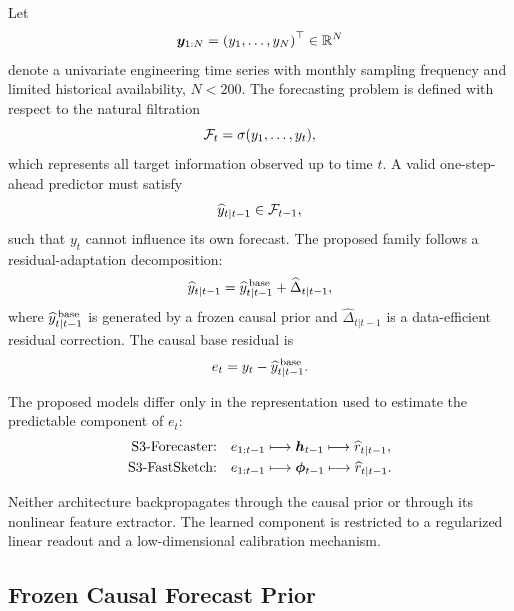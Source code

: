 \documentclass[review,number,sort&compress]{elsarticle}
\begin{document}
Let
\begin{equation}
    \bm{y}_{1:N}
    =
    \left(y_1,\ldots,y_N\right)^\top
    \in \mathbb{R}^N
\end{equation}
denote a univariate engineering time series with monthly sampling frequency and
limited historical availability, $N<200$. The forecasting problem is defined
with respect to the natural filtration
\begin{equation}
    \mathcal{F}_t
    =
    \sigma(y_1,\ldots,y_t),
\end{equation}
which represents all target information observed up to time $t$. A valid
one-step-ahead predictor must satisfy
\begin{equation}
    \widehat{y}_{t|t-1}
    \in
    \mathcal{F}_{t-1},
\end{equation}
such that $y_t$ cannot influence its own forecast.
The proposed family follows a residual-adaptation decomposition:
\begin{equation}
    \widehat{y}_{t|t-1}
    =
    \widehat{y}^{\,\mathrm{base}}_{t|t-1}
    +
    \widehat{\Delta}_{t|t-1},
    \label{eq:general_decomposition}
\end{equation}
where $\widehat{y}^{\,\mathrm{base}}_{t|t-1}$ is generated by a frozen causal prior and
$\widehat{\Delta}_{t|t-1}$ is a data-efficient residual correction. The causal
base residual is
\begin{equation}
    e_t
    =
    y_t-\widehat{y}^{\,\mathrm{base}}_{t|t-1}.
    \label{eq:base_residual}
\end{equation}

The proposed models differ only in the representation used to estimate the
predictable component of $e_t$:
\begin{align}
    \text{S3-Forecaster:}
    \quad&
    e_{1:t-1}
    \longmapsto
    \bm{h}_{t-1}
    \longmapsto
    \widehat{r}_{t|t-1},
    \\
    \text{S3-FastSketch:}
    \quad&
    e_{1:t-1}
    \longmapsto
    \bm{\phi}_{t-1}
    \longmapsto
    \widehat{r}_{t|t-1}.
\end{align}

Neither architecture backpropagates through the causal prior or through its
nonlinear feature extractor. The learned component is restricted to a
regularized linear readout and a low-dimensional calibration mechanism.

\subsection{Frozen Causal Forecast Prior}
\label{subsec:causal_prior}
\end{document}
